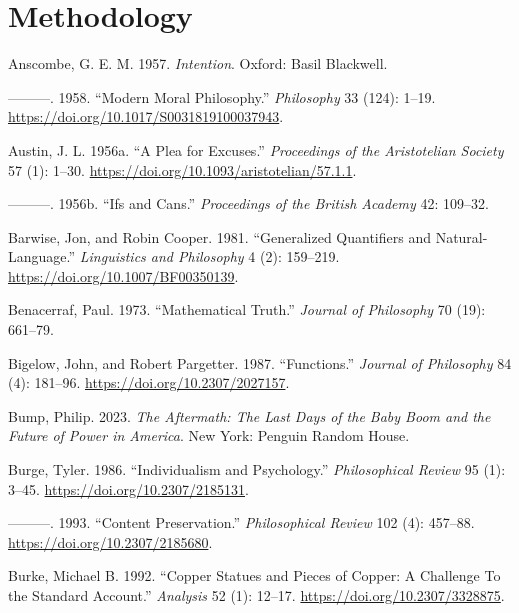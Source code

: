 \documentclass[
  12pt,
  letterpaper,
  DIV=11,
  numbers=noendperiod]{scrartcl}
\newlength{\cslhangindent}
\newenvironment{CSLReferences}[2] %
 {\begin{list}{}{%
  \setlength{\itemindent}{0pt}
  \setlength{\leftmargin}{0pt}
  \setlength{\parsep}{0pt}
  \ifodd #1
   \setlength{\leftmargin}{\cslhangindent}
   \setlength{\itemindent}{-1\cslhangindent}
  \fi
  \setlength{\itemsep}{#2\baselineskip}}}
 {\end{list}}
\begin{document}
\section{Methodology}\label{sec-methodology}

\label{refs}
\begin{CSLReferences}{1}{0}
Anscombe, G. E. M. 1957. \emph{Intention}. Oxford: Basil Blackwell.

---------. 1958. {``Modern Moral Philosophy.''} \emph{Philosophy} 33
(124): 1--19. \url{https://doi.org/10.1017/S0031819100037943}.

Austin, J. L. 1956a. {``A Plea for Excuses.''} \emph{Proceedings of the
Aristotelian Society} 57 (1): 1--30.
\url{https://doi.org/10.1093/aristotelian/57.1.1}.

---------. 1956b. {``Ifs and Cans.''} \emph{Proceedings of the British
Academy} 42: 109--32.

Barwise, Jon, and Robin Cooper. 1981. {``Generalized Quantifiers and
Natural-Language.''} \emph{Linguistics and Philosophy} 4 (2): 159--219.
\url{https://doi.org/10.1007/BF00350139}.

Benacerraf, Paul. 1973. {``Mathematical Truth.''} \emph{Journal of
Philosophy} 70 (19): 661--79.

Bigelow, John, and Robert Pargetter. 1987. {``Functions.''}
\emph{Journal of Philosophy} 84 (4): 181--96.
\url{https://doi.org/10.2307/2027157}.

Bump, Philip. 2023. \emph{The Aftermath: The Last Days of the Baby Boom
and the Future of Power in America}. New York: Penguin Random House.

Burge, Tyler. 1986. {``Individualism and Psychology.''}
\emph{Philosophical Review} 95 (1): 3--45.
\url{https://doi.org/10.2307/2185131}.

---------. 1993. {``Content Preservation.''} \emph{Philosophical Review}
102 (4): 457--88. \url{https://doi.org/10.2307/2185680}.

Burke, Michael B. 1992. {``Copper Statues and Pieces of Copper: A
Challenge To the Standard Account.''} \emph{Analysis} 52 (1): 12--17.
\url{https://doi.org/10.2307/3328875}.


\end{CSLReferences}
\end{document}
